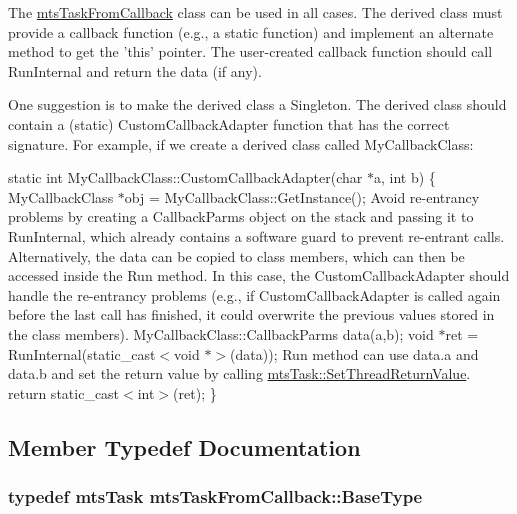 The \hyperlink{classmts_task_from_callback}{mts\-Task\-From\-Callback} class can be used in all cases. The derived class must provide a callback function (e.\-g., a static function) and implement an alternate method to get the 'this' pointer. The user-\/created callback function should call Run\-Internal and return the data (if any).

One suggestion is to make the derived class a Singleton. The derived class should contain a (static) Custom\-Callback\-Adapter function that has the correct signature. For example, if we create a derived class called My\-Callback\-Class\-:

static int My\-Callback\-Class\-::\-Custom\-Callback\-Adapter(char $\ast$a, int b) \{ My\-Callback\-Class $\ast$obj = My\-Callback\-Class\-::\-Get\-Instance(); Avoid re-\/entrancy problems by creating a Callback\-Parms object on the stack and passing it to Run\-Internal, which already contains a software guard to prevent re-\/entrant calls. Alternatively, the data can be copied to class members, which can then be accessed inside the Run method. In this case, the Custom\-Callback\-Adapter should handle the re-\/entrancy problems (e.\-g., if Custom\-Callback\-Adapter is called again before the last call has finished, it could overwrite the previous values stored in the class members). My\-Callback\-Class\-::\-Callback\-Parms data(a,b); void $\ast$ret = Run\-Internal(static\-\_\-cast$<$void $\ast$$>$(data)); Run method can use data.\-a and data.\-b and set the return value by calling \hyperlink{classmts_task_a89f212237d9b7e453c91df8a1a6962d2}{mts\-Task\-::\-Set\-Thread\-Return\-Value}. return static\-\_\-cast$<$int$>$(ret); \} 

\subsection{Member Typedef Documentation}
\hypertarget{classmts_task_from_callback_ab3e56b62478363211e93e97548fcac6f}{
\subsubsection[{Base\-Type}]{\setlength{\rightskip}{0pt plus 5cm}typedef {\bf mts\-Task} {\bf mts\-Task\-From\-Callback\-::\-Base\-Type}\hspace{0.3cm}{\ttfamily [protected]}}}\label{classmts_task_from_callback_ab3e56b62478363211e93e97548fcac6f}



